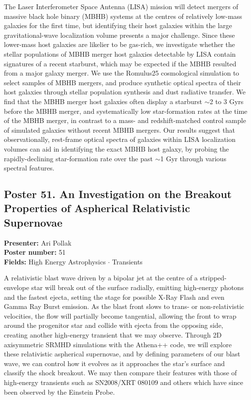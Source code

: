 The Laser Interferometer Space Antenna (LISA) mission will detect mergers of massive black hole binary (MBHB) systems at the centres of relatively low-mass galaxies for the first time, but identifying their host galaxies within the large gravitational-wave localization volume presents a major challenge. Since these lower-mass host galaxies are likelier to be gas-rich, we investigate whether the stellar populations of MBHB merger host galaxies detectable by LISA contain signatures of a recent starburst, which may be expected if the MBHB resulted from a major galaxy merger. We use the Romulus25 cosmological simulation to select samples of MBHB mergers, and produce synthetic optical spectra of their host galaxies through stellar population synthesis and dust radiative transfer. We find that the MBHB merger host galaxies often display a starburst $\sim$2 to 3 Gyrs before the MBHB merger, and systematically low star-formation rates at the time of the MBHB merger, in contrast to a mass- and redshift-matched control sample of simulated galaxies without recent MBHB mergers. Our results suggest that observationally, rest-frame optical spectra of galaxies within LISA localization volumes can aid in identifying the exact MBHB host galaxy, by probing the rapidly-declining star-formation rate over the past $\sim$1 Gyr through various spectral features.

\hypertarget{poster-abstract-talk-313}{}\label{poster-abstract-page-talk-313}
\subsection*{Poster 51. An Investigation on the Breakout Properties of Aspherical Relativistic Supernovae}
\textbf{Presenter:} Ari Pollak\\
\textbf{Poster number:} 51\\
\textbf{Fields:} High Energy Astrophysics $\cdot$ Transients

A relativistic blast wave driven by a bipolar jet at the centre of a stripped-envelope star will break out of the surface radially, emitting high-energy photons and the fastest ejecta, setting the stage for possible X-Ray Flash and even Gamma Ray Burst emission. As the blast front slows to trans- or non-relativistic velocities, the flow will partially become tangential, allowing the front to wrap around the progenitor star and collide with ejecta from the opposing side, creating another high-energy transient that we may observe. Through 2D axisymmetric SRMHD simulations with the Athena++ code, we will explore these relativistic aspherical supernovae, and by defining parameters of our blast wave, we can control how it evolves as it approaches the star's surface and classify the shock breakout. We may then compare their features with those of high-energy transients such as SN2008/XRT 080109 and others which have since been observed by the Einstein Probe.

